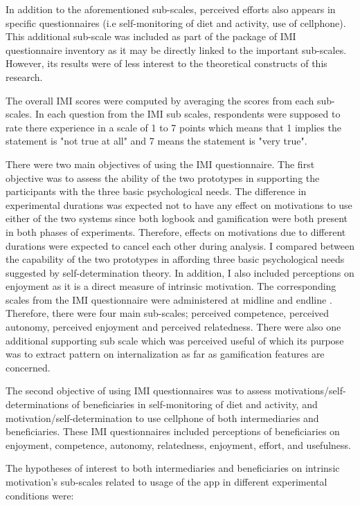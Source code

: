 In addition to the aforementioned sub-scales, perceived efforts also appears in specific questionnaires (i.e self-monitoring of diet and activity, use of cellphone). This additional sub-scale was included as part of the package of IMI questionnaire inventory as it may be directly linked to the important sub-scales. However, its results were of less interest to the theoretical constructs of this research.
  
The overall IMI scores were computed by averaging the scores from each sub-scales. In each question from the IMI sub scales, respondents were supposed to rate there experience in a scale of 1 to 7 points which means that 1 implies the statement is "not true at all" and 7 means the statement is "very true".

There were two main objectives of using the IMI questionnaire. The first objective was to assess the ability of the two prototypes in supporting the participants with the three basic psychological needs. The difference in experimental durations was expected not to have any effect on motivations to use either of the two systems since both logbook and gamification were both present in both phases of experiments. Therefore, effects on motivations due to different durations were expected to cancel each other during analysis. I compared between the capability of the two prototypes in affording three basic psychological needs suggested by self-determination theory. In addition, I also included perceptions on enjoyment as it is a direct measure of intrinsic motivation. The corresponding scales from the IMI questionnaire were administered at midline and endline . Therefore, there were four main sub-scales; perceived competence, perceived autonomy, perceived enjoyment and perceived relatedness. There were also one additional supporting sub scale which was perceived useful of which its purpose was to extract pattern on internalization as far as gamification features are concerned.

The second objective of using IMI questionnaires was to assess motivations/self-determinations of beneficiaries in self-monitoring of diet and activity, and motivation/self-determination to use cellphone of both intermediaries and beneficiaries. These IMI questionnaires included perceptions of beneficiaries on enjoyment, competence, autonomy, relatedness, enjoyment, effort, and usefulness.

The hypotheses of interest to both intermediaries and beneficiaries on intrinsic motivation's sub-scales related to usage of the app in different experimental conditions were:


